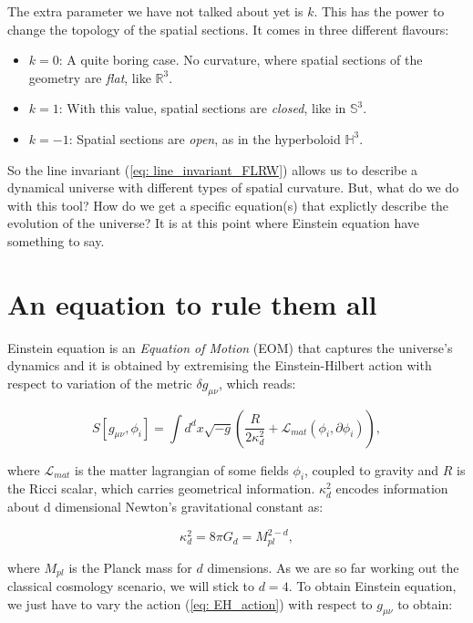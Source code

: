 \documentclass[11pt, a4paper]{article} %
\renewcommand{\it}{\textit}
\begin{document}
The extra parameter we have not talked about yet is $k$. This has the power to change the topology of the spatial sections. It comes in three different flavours:

\begin{itemize}
	\item $k = 0$: A quite boring case. No curvature, where spatial sections of the geometry are \it{flat}, like $\mathbb{R}^{3}$.
	\item $k = 1$: With this value, spatial sections are \it{closed}, like in $\mathbb{S}^{3}$.
	\item $k = -1$: Spatial sections are \it{open}, as in the hyperboloid $\mathbb{H}^{3}$.
\end{itemize}

So the line invariant (\ref{eq: line_invariant_FLRW}) allows us to describe a dynamical universe with different types of spatial curvature. But, what do we do with this tool? How do we get a specific equation(s) that explictly describe the evolution of the universe? It is at this point where Einstein equation have something to say.

\section*{An equation to rule them all}

Einstein equation is an \textit{Equation of Motion} (EOM) that captures the universe's dynamics and it is obtained by extremising the Einstein-Hilbert action with respect to variation of the metric $\delta g_{\mu\nu}$, which reads:

\begin{equation}\label{eq: EH_action}
	S[g_{\mu\nu}, \phi_{i}] = \int d^{d}x \sqrt{-g} \left(\frac{R}{2 \kappa^{2}_{d}} + \mathcal{L}_{mat}(\phi_{i}, \partial \phi_{i})\right), 
\end{equation}

where $\mathcal{L}_{mat}$ is the matter lagrangian of some fields $\phi_{i}$, coupled to gravity and $R$ is the Ricci scalar, which carries geometrical information. $\kappa^{2}_{d}$ encodes information about d dimensional Newton's gravitational constant as:

\begin{equation}
	\kappa^{2}_{d} = 8 \pi G_{d} = M_{pl}^{2-d},
\end{equation}

where $M_{pl}$ is the Planck mass for $d$ dimensions. As we are so far working out the classical cosmology scenario, we will stick to $d = 4$. To obtain Einstein equation, we just have to vary the action (\ref{eq: EH_action}) with respect to $g_{\mu \nu}$ to obtain:
\end{document}
